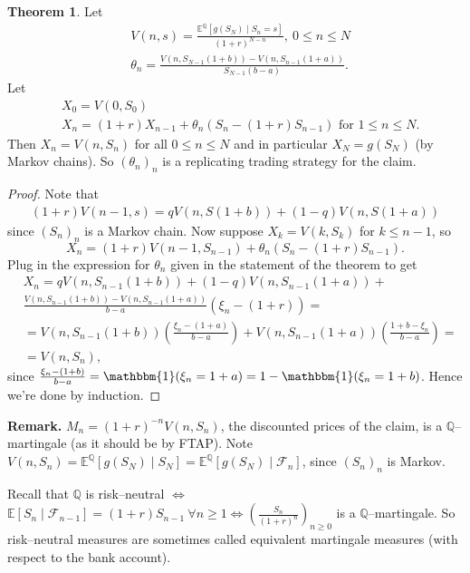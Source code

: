 \documentclass{article}
\theoremstyle{definition}
\newtheorem{theorem}{Theorem}[section]
\begin{document}
\begin{theorem}
    Let 
    \begin{align*}
        &V(n,s) = \frac{\mathbb{E}^\mathbb{Q}[g(S_N) \mid S_{n}=s]}{(1+r)^{N-n}}, ~0\le n\le N \\
        & \theta_n = \frac{V(n,S_{N-1}(1+b))-V(n,S_{n-1}(1+a))}{S_{N-1}(b-a)}.
    \end{align*}
    Let 
    \begin{align*}
        &X_0 = V(0,S_0)\\
        &X_n = (1+r)X_{n-1} + \theta_n(S_n-(1+r)S_{n-1}) \text{ for }1\le n\le N.
    \end{align*}
    Then $X_n = V(n,S_n)$ for all $0\le n\le N$ and in particular $X_N=g(S_N)$ (by Markov chains). So $(\theta_n)_n$ is a replicating trading strategy for the claim.
\end{theorem}
\begin{proof}
    Note that
    \begin{align*}
        (1+r)V(n-1,s) = qV(n,S(1+b)) + (1-q)V(n,S(1+a))
    \end{align*}
    since $(S_n)_n$ is a Markov chain. Now suppose $X_k=V(k,S_k)$ for $k\le n-1$, so \[
    X_n=(1+r)V(n-1,S_{n-1}) + \theta_n(S_n-(1+r)S_{n-1}).
    \]
    Plug in the expression for $\theta_n$ given in the statement of the theorem to get
    \begin{align*}
        &X_n = qV(n,S_{n-1}(1+b)) + (1-q)V(n,S_{n-1}(1+a))+\\
        &\frac{V(n,S_{n-1}(1+b))-V(n,S_{n-1}(1+a))}{b-a}(\xi_n-(1+r)) = \\
        &= V(n,S_{n-1}(1+b))\left(\frac{\xi_n-(1+a)}{b-a}\right) + V(n,S_{n-1}(1+a))\left(\frac{1+b-\xi_n}{b-a}\right) = \\
        &=V(n,S_n),
    \end{align*}
    since $\frac{\xi_n- (1+b)}{b-a} =\mathbbm{1}(\xi_n=1+a)=1-\mathbbm{1}(\xi_n=1+b)$. Hence we're done by induction.
\end{proof}
\textbf{Remark.} $M_n = (1+r)^{-n} V(n,S_n)$, the discounted prices of the claim, is a $\mathbb{Q}$--martingale (as it should be by FTAP). Note $V(n,S_n) = \mathbb{E}^\mathbb{Q}[g(S_N) \mid S_N] = \mathbb{E}^\mathbb{Q}[g(S_N) \mid \mathcal{F}_n]$, since $(S_n)_n$ is Markov.
\vspace{1mm}

Recall that $\mathbb{Q}$ is risk--neutral $\iff$ $\mathbb{E}[S_n \mid \mathcal{F}_{n-1}]=(1+r)S_{n-1} ~\forall n\ge 1 \iff \left(\frac{S_n}{(1+r)^n}\right)_{n\ge 0}$ is a $\mathbb{Q}$--martingale. So risk--neutral measures are sometimes called equivalent martingale measures (with respect to the bank account).
\end{document}

